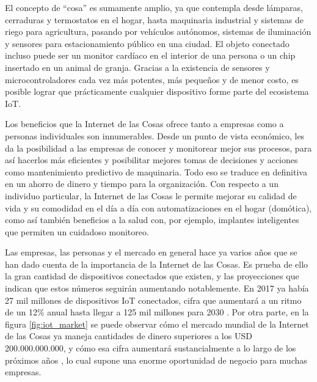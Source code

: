 El concepto de \enquote{cosa} es sumamente amplio, ya que contempla desde lámparas, cerraduras y termostatos en el hogar, hasta maquinaria industrial y sistemas de riego para agricultura, pasando por vehículos autónomos, sistemas de iluminación y sensores para estacionamiento público en una ciudad. El objeto conectado incluso puede ser un monitor cardíaco en el interior de una persona o un chip insertado en un animal de granja. Gracias a la existencia de sensores y microcontroladores cada vez más potentes, más pequeños y de menor costo, es posible lograr que prácticamente cualquier dispositivo forme parte del ecosistema IoT.

Los beneficios que la Internet de las Cosas ofrece tanto a empresas como a personas individuales son innumerables. Desde un punto de vista económico, les da la posibilidad a las empresas de conocer y monitorear mejor sus procesos, para así hacerlos más eficientes y posibilitar mejores tomas de decisiones y acciones como mantenimiento predictivo de maquinaria. Todo eso se traduce en definitiva en un ahorro de dinero y tiempo para la organización. Con respecto a un individuo particular, la Internet de las Cosas le permite mejorar su calidad de vida y su comodidad en el día a día con automatizaciones en el hogar (domótica), como así también beneficios a la salud con, por ejemplo, implantes inteligentes que permiten un cuidadoso monitoreo.

Las empresas, las personas y el mercado en general hace ya varios años que se han dado cuenta de la importancia de la Internet de las Cosas. Es prueba de ello la gran cantidad de dispositivos conectados que existen, y las proyecciones que indican que estos números seguirán aumentando notablemente. En 2017 ya había 27 mil millones de dispositivos IoT conectados, cifra que aumentará a un ritmo de un 12\% anual hasta llegar a 125 mil millones para 2030 \citep{1}. Por otra parte, en la figura \ref{fig:iot_market} se puede observar cómo el mercado mundial de la Internet de las Cosas ya maneja cantidades de dinero superiores a los USD 200.000.000.000, y cómo esa cifra aumentará sustancialmente a lo largo de los próximos años \citep{2}, lo cual supone una enorme oportunidad de negocio para muchas empresas.

